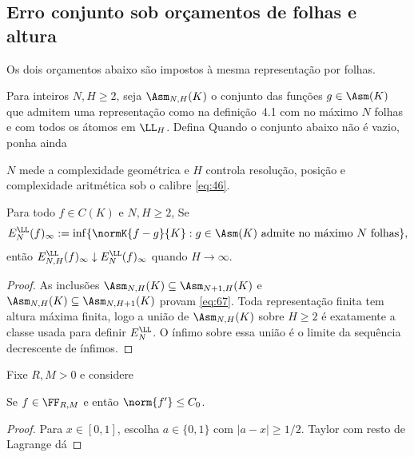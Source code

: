 \subsection{Erro conjunto sob orçamentos de folhas e altura}
Os dois orçamentos abaixo são impostos à mesma representação por folhas.
\begin{definicao}
Para inteiros $N,H\ge2$, seja $\Asm_{N,H}(K)$ o conjunto das funções $g\in\Asm(K)$ que admitem uma representação como na definição~4.1 com no máximo $N$ folhas e com todos os átomos em $\LL_H$. Defina
Quando o conjunto abaixo não é vazio, ponha ainda
\end{definicao}
$N$ mede a complexidade geométrica e $H$ controla resolução, posição e complexidade aritmética sob o calibre \eqref{eq:46}.

\begin{proposicao}
Para todo $f\in C(K)$ e $N,H\ge2$,
Se
\[
E^{\LL}_N(f)_\infty:=\inf\{\normK{f-g}{K}:g\in\Asm(K)\text{ admite no máximo }N\text{ folhas}\},
\]
então $E^{\LL}_{N,H}(f)_\infty\downarrow E^{\LL}_N(f)_\infty$ quando $H\to\infty$.
\end{proposicao}
\begin{proof}
As inclusões $\Asm_{N,H}(K)\subseteq\Asm_{N+1,H}(K)$ e $\Asm_{N,H}(K)\subseteq\Asm_{N,H+1}(K)$ provam \eqref{eq:67}. Toda representação finita tem altura máxima finita, logo a união de $\Asm_{N,H}(K)$ sobre $H\ge2$ é exatamente a classe usada para definir $E^{\LL}_N$. O ínfimo sobre essa união é o limite da sequência decrescente de ínfimos.
\end{proof}
Fixe $R,M>0$ e considere

\begin{lema}
Se $f\in\FF_{R,M}$ e
então $\norm{f'}\le C_0$.
\end{lema}
\begin{proof}
Para $x\in[0,1]$, escolha $a\in\{0,1\}$ com $|a-x|\ge1/2$. Taylor com resto de Lagrange dá
\end{proof}

